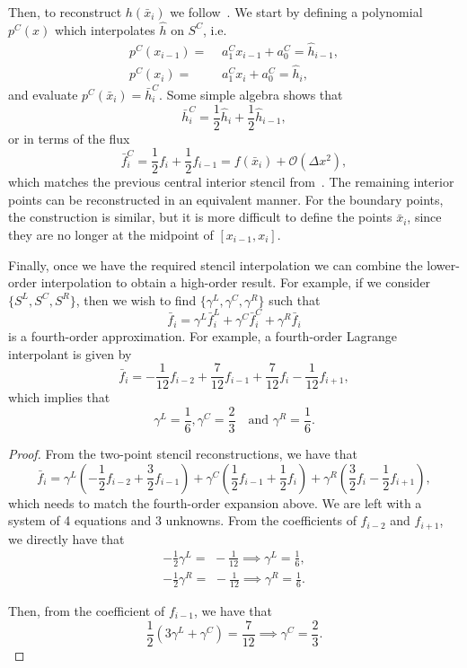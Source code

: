 \documentclass{scrartcl}
\begin{document}
Then, to reconstruct $h(\bar{x}_i)$ we follow~\cite[Section 2.2]{Shu2009}.
We start by defining a polynomial $p^C(x)$ which interpolates $\hat{h}$ on $S^C$,
i.e.
\[
\begin{aligned}
p^C(x_{i - 1}) =\,\, & a_1^C x_{i - 1} + a_0^C = \hat{h}_{i - 1}, \\
p^C(x_i) =\,\, & a_1^C x_i + a_0^C = \hat{h}_i,
\end{aligned}
\]
and evaluate $p^C(\bar{x}_i) = \bar{h}^{C}_i$. Some simple algebra shows that
\[
\bar{h}^C_i = \frac{1}{2} \hat{h}_i + \frac{1}{2} \hat{h}_{i - 1},
\]
or in terms of the flux
\[
\bar{f}^C_i = \frac{1}{2} f_i + \frac{1}{2} f_{i - 1}
= f(\bar{x}_i) + \mathcal{O}(\Delta x^2),
\]
which matches the previous central interior stencil from~.
The remaining interior points can be reconstructed in an equivalent manner.
For the boundary points, the construction is similar, but it is more difficult
to define the points $\bar{x}_i$, since they are no longer at the midpoint of
$[x_{i - 1}, x_i]$.

Finally, once we have the required stencil interpolation we can combine the
lower-order interpolation to obtain a high-order result. For example, if we
consider $\{S^L, S^C, S^R\}$, then we wish to find $\{\gamma^L, \gamma^C, \gamma^R\}$
such that
\[
\bar{f}_i = \gamma^L \bar{f}^L_i + \gamma^C \bar{f}^C_i + \gamma^R \bar{f}_i
\]
is a fourth-order approximation. For example, a fourth-order Lagrange interpolant
is given by
\[
\bar{f}_i = -\frac{1}{12} f_{i - 2} + \frac{7}{12} f_{i - 1} + \frac{7}{12} f_i - \frac{1}{12} f_{i + 1},
\]
which implies that
\[
\gamma^L = \frac{1}{6},
\gamma^C = \frac{2}{3}
\quad \text{and }
\gamma^R = \frac{1}{6}.
\]

\begin{proof}
From the two-point stencil reconstructions, we have that
\[
\bar{f}_i =
\gamma^L \left(-\frac{1}{2} f_{i - 2} + \frac{3}{2} f_{i - 1}\right)
+ \gamma^C \left(\frac{1}{2} f_{i - 1} + \frac{1}{2} f_i\right)
+ \gamma^R \left(\frac{3}{2} f_i - \frac{1}{2} f_{i + 1}\right),
\]
which needs to match the fourth-order expansion above. We are left with a system
of 4 equations and 3 unknowns. From the coefficients of $f_{i - 2}$ and $f_{i + 1}$,
we directly have that
\[
\begin{aligned}
-\frac{1}{2} \gamma^L =\,\, -\frac{1}{12} \implies \gamma^L = \frac{1}{6}, \\
-\frac{1}{2} \gamma^R =\,\, -\frac{1}{12} \implies \gamma^R = \frac{1}{6}.
\end{aligned}
\]

Then, from the coefficient of $f_{i - 1}$, we have that
\[
\frac{1}{2} (3 \gamma^L + \gamma^C) = \frac{7}{12} \implies
\gamma^C = \frac{2}{3}.
\]
\end{proof}
\end{document}
